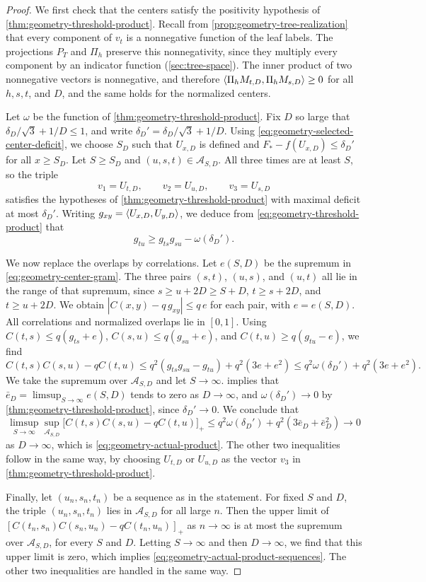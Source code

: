\begin{proof}
We first check that the centers satisfy the positivity hypothesis of \cref{thm:geometry-threshold-product}. Recall from \cref{prop:geometry-tree-realization} that every component of $v_t$ is a nonnegative function of the leaf labels. The projections $P_T$ and $\Pi_h$ preserve this nonnegativity, since they multiply every component by an indicator function (\cref{sec:tree-space}). The inner product of two nonnegative vectors is nonnegative, and therefore $\left\langle\Pi_hM_{t,D},\Pi_hM_{s,D}\right\rangle\ge0$ for all $h,s,t$, and $D$, and the same holds for the normalized centers.

Let $\omega$ be the function of \cref{thm:geometry-threshold-product}. Fix $D$ so large that $\delta_D/\sqrt3+1/D\le1$, and write $\delta_D'=\delta_D/\sqrt3+1/D$. Using \eqref{eq:geometry-selected-center-deficit}, we choose $S_D$ such that $U_{x,D}$ is defined and $F_*-f(U_{x,D})\le\delta_D'$ for all $x\ge S_D$. Let $S\ge S_D$ and $(u,s,t)\in\mathcal A_{S,D}$. All three times are at least $S$, so the triple
\[
 v_1=U_{t,D},\qquad v_2=U_{u,D},\qquad v_3=U_{s,D}
\]
satisfies the hypotheses of \cref{thm:geometry-threshold-product} with maximal deficit at most $\delta_D'$. Writing $g_{xy}=\left\langle U_{x,D},U_{y,D}\right\rangle$, we deduce from \eqref{eq:geometry-threshold-product} that
\[
 g_{tu}\ge g_{ts}g_{su}-\omega(\delta_D') .
\]

We now replace the overlaps by correlations. Let $e(S,D)$ be the supremum in \eqref{eq:geometry-center-gram}. The three pairs $(s,t)$, $(u,s)$, and $(u,t)$ all lie in the range of that supremum, since $s\ge u+2D\ge S+D$, $t\ge s+2D$, and $t\ge u+2D$. We obtain $|C(x,y)-q\,g_{xy}|\le q\,e$ for each pair, with $e=e(S,D)$. All correlations and normalized overlaps lie in $[0,1]$. Using $C(t,s)\le q(g_{ts}+e)$, $C(s,u)\le q(g_{su}+e)$, and $C(t,u)\ge q(g_{tu}-e)$, we find
\[
 C(t,s)C(s,u)-qC(t,u)
 \le q^2(g_{ts}g_{su}-g_{tu})+q^2(3e+e^2)
 \le q^2\omega(\delta_D')+q^2(3e+e^2) .
\]
We take the supremum over $\mathcal A_{S,D}$ and let $S\to\infty$.  implies that $\bar e_D=\limsup_{S\to\infty}e(S,D)$ tends to zero as $D\to\infty$, and $\omega(\delta_D')\to0$ by \cref{thm:geometry-threshold-product}, since $\delta_D'\to0$. We conclude that
\[
 \limsup_{S\to\infty}\sup_{\mathcal A_{S,D}}\bigl[C(t,s)C(s,u)-qC(t,u)\bigr]_+\le q^2\omega(\delta_D')+q^2(3\bar e_D+\bar e_D^2)\longrightarrow0
\]
as $D\to\infty$, which is \eqref{eq:geometry-actual-product}. The other two inequalities follow in the same way, by choosing $U_{t,D}$ or $U_{u,D}$ as the vector $v_3$ in \cref{thm:geometry-threshold-product}.

Finally, let $(u_n,s_n,t_n)$ be a sequence as in the statement. For fixed $S$ and $D$, the triple $(u_n,s_n,t_n)$ lies in $\mathcal A_{S,D}$ for all large $n$. Then the upper limit of $[C(t_n,s_n)C(s_n,u_n)-qC(t_n,u_n)]_+$ as $n\to\infty$ is at most the supremum over $\mathcal A_{S,D}$, for every $S$ and $D$. Letting $S\to\infty$ and then $D\to\infty$, we find that this upper limit is zero, which implies \eqref{eq:geometry-actual-product-sequences}. The other two inequalities are handled in the same way.
\end{proof}

